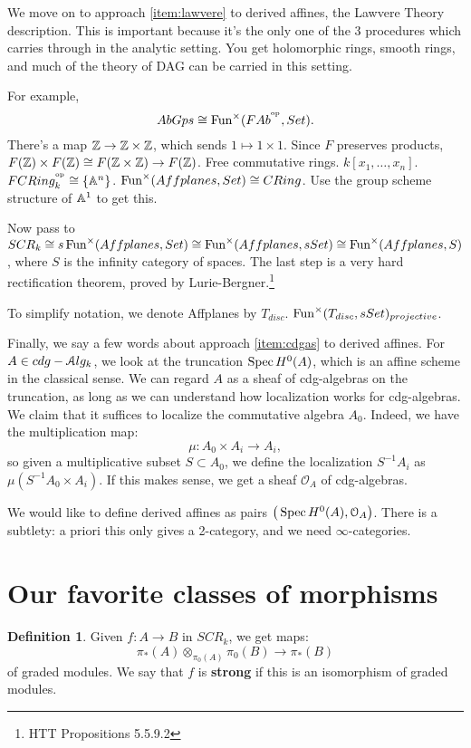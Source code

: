 \documentclass[10pt,a4paper,reqno,oneside]{book} %
\theoremstyle{plain}
\theoremstyle{definition}
\newtheorem{defin}[thm]{Definition}
\theoremstyle{remark}
\numberwithin{equation}{section}
\begin{document}
We move on to approach \ref{item:lawvere} to derived affines, the Lawvere Theory description. 
This is important because
it's the only one of the 3 procedures which carries through in the analytic setting. You get holomorphic rings, smooth rings,
and much of the theory of DAG can be carried in this setting.

For example,
\[	AbGps \cong \operatorname{Fun}^{\times}(FAb^{^\mathrm{op}}, Set).	\]
There's a map $\mathbb Z \to \mathbb Z \times \mathbb Z$, which sends $1\mapsto 1\times 1$. Since $F$ preserves products, $F(\mathbb Z) \times F(\mathbb Z)
\cong F(\mathbb Z \times \mathbb Z) \to F(\mathbb Z)$. Free commutative rings. $k[x_1, \dots, x_n]$. $FCRing_k^{^\mathrm{op}} \cong \{\mathbb A^n\}$.
$\operatorname{Fun}^{\times}(Affplanes, Set) \cong CRing$. Use the group scheme structure of $\mathbb A^1$ to get this.

Now pass to $SCR_k \cong s\operatorname{Fun}^{\times}(Affplanes, Set) \cong \operatorname{Fun}^{\times}(Affplanes, sSet) \cong \operatorname{Fun}^{\times}
(Affplanes, S)$, where $S$ is the infinity category of spaces. The last step is a very hard rectification theorem, proved
by Lurie-Bergner.\footnote{HTT Propositions 5.5.9.2} 

To simplify notation, we denote Affplanes by $T_{disc}$. $\operatorname{Fun}^{\times}(T_{disc}, sSet)_{projective}$. 


Finally, we say a few words about approach \ref{item:cdgas} to derived affines. For $A \in cdg-\mathcal A lg_k$, we look at
the truncation $\operatorname{Spec} H^0(A)$, which is an affine scheme in the classical sense. We can regard $A$ 
as a sheaf of cdg-algebras on the truncation, as long as we can understand how localization works for cdg-algebras. 
We claim that it suffices to localize the commutative algebra $A_0$. Indeed, we have the multiplication map:
\[	\mu:	A_0 \times A_i \to A_i,		\]
so given a multiplicative subset $S \subset A_0$, we define the localization $S^{-1}A_i$ as $\mu(S^{-1}A_0 \times A_i)$.
If this makes sense, we get a sheaf $\mathcal{O}_A$ of cdg-algebras.

We would like to define derived affines as pairs $\big(\operatorname{Spec} H^0(A), \mathcal{O}_A\big)$. There is a subtlety: a priori 
this only gives a 2-category, and we need $\infty$-categories.



\section{Our favorite classes of morphisms}
\begin{defin}
Given $f: A \to B$ in $SCR_k$, we get maps:
\[	\pi_*(A) \otimes_{\pi_0(A)} \pi_0(B) \to \pi_*(B)	\]
of graded modules. We say that $f$ is \textbf{strong} if this is an isomorphism of graded modules.
\end{defin}
\end{document}

